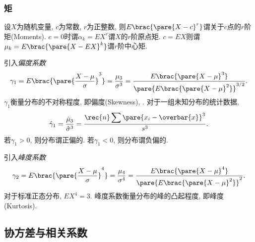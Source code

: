 \documentclass{ctexart}
\begin{document}
\subsubsection{矩} %
\label{ssub:矩}

设$X$为随机变量, $c$为常数, $r$为正整数, 则$E\brac{\pare{X-c}^r}$谓关于$c$点的$r$阶矩(Moments). $c=0$时谓$\alpha_k = EX^r$谓$X$的$r$阶原点矩. $c=EX$则谓$\mu_k = E\brac{\pare{X-EX}^k}$谓$r$阶中心矩.
\par
引入\emph{偏度系数}
\[ \gamma_1 = E\brac{\pare{\frac{X-\mu}{\sigma}}^3} = \frac{\mu_3}{\sigma^3} = \frac{E\brac{\pare{X-\mu}^3}}{\pare{E\brac{\pare{X-\mu}^2}}^{3/2}}. \]
$\gamma_1$衡量分布的不对称程度, 即偏度(Skewness), . 对于一组未知分布的统计数据,
\[ \hat{\gamma}_1 = \frac{\hat{\mu}_3}{\hat{\sigma}^3} = \frac{\displaystyle \rec{n} \sum\pare{x_i - \overbar{x}}^3}{s^3}. \]
若$\gamma_1 > 0$, 则分布谓正偏的. 若$\gamma_1 < 0$, 则分布谓负偏的.
\par
引入\emph{峰度系数}
\[ \gamma_2 = E\brac{\pare{\frac{X-\mu}{\sigma}}^4} = \frac{\mu_4}{\sigma^4} = \frac{E\brac{\pare{X-\mu}^4}}{\pare{E\brac{\pare{X-\mu}^2}}^2}. \]
对于标准正态分布, $EX^4 = 3$. 峰度系数衡量分布的峰的凸起程度, 即峰度(Kurtosis).



\subsection{协方差与相关系数} %
\label{sub:协方差与相关系数}
\end{document}
